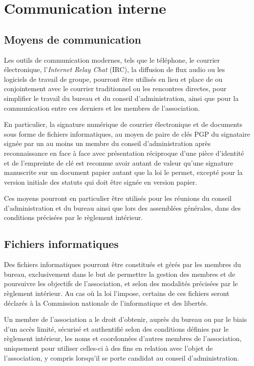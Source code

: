 \documentclass[a4wide,12pt]{scrartcl}
\begin{document}
\section{Communication interne}

\subsection{Moyens de communication}

Les outils de communication modernes, tels que le téléphone, le
courrier électronique, l'\textit{Internet Relay Chat} (IRC), la
diffusion de flux audio ou les logiciels de travail de groupe, pourront
être utilisés en lieu et place de ou conjointement avec le courrier
traditionnel ou les rencontres directes, pour simplifier le travail du
bureau et du conseil d'administration, ainsi que pour la communication
entre ces derniers et les membres de l'association.

En particulier, la signature numérique de courrier électronique et de
documents sous forme de fichiers informatiques, au moyen de paire de
clés PGP du signataire signée par un au moins un membre du conseil
d'administration après reconnaissance en face à face avec présentation
réciproque d'une pièce d'identité et de l'empreinte de clé est
reconnue avoir autant de valeur qu'une signature manuscrite sur un
document papier autant que la loi le permet, excepté pour la version
initiale des statuts qui doit être signée en version papier.

Ces moyens pourront en particulier être utilisés pour les réunions du
conseil d'administration et du bureau ainsi que lors des assemblées
générales, dans des conditions précisées par le règlement intérieur.

\subsection{Fichiers informatiques}

Des fichiers informatiques pourront être constitués et gérés par les
membres du bureau, exclusivement dans le but de permettre la gestion
des membres et de poursuivre les objectifs de l'association, et selon
des modalités précisées par le règlement intérieur.  Au cas où la loi
l'impose, certains de ces fichiers seront déclarés à la
Commission nationale de l'informatique et des libertés.

Un membre de l'association a le droit d'obtenir, auprès du bureau ou
par le biais d'un accès limité, sécurisé et authentifié selon des
conditions définies par le règlement intérieur, les noms et
coordonnées d'autres membres de l'association, uniquement pour
utiliser celles-ci à des fins en relation avec l'objet de
l'association, y compris lorsqu'il se porte candidat au conseil
d'administration.
\end{document}
